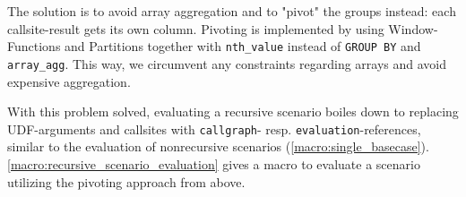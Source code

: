 The solution is to avoid array aggregation and to "pivot" the groups instead: each callsite-result gets its own column. Pivoting is implemented by using Window-Functions and Partitions together with \texttt{nth\_value} instead of \texttt{GROUP BY} and \texttt{array\_agg}. This way, we circumvent any constraints regarding arrays and avoid expensive aggregation.

\vspace{5mm}

With this problem solved, evaluating a recursive scenario boiles down to replacing UDF-arguments and callsites with \texttt{callgraph}- resp. \texttt{evaluation}-references, similar to the evaluation of nonrecursive scenarios (\autoref{macro:single_basecase}). \autoref{macro:recursive_scenario_evaluation} gives a macro to evaluate a scenario utilizing the pivoting approach from above.

